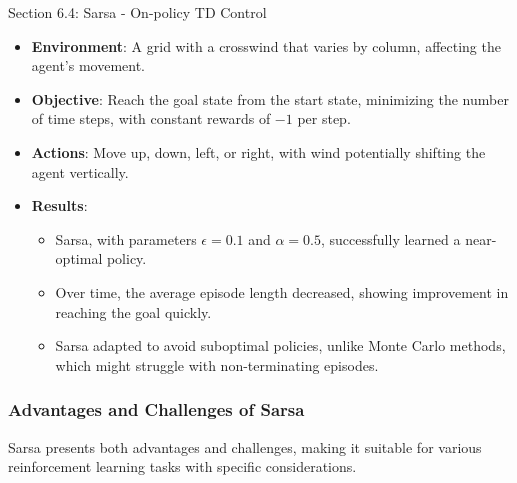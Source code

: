 \begin{notes}{Section 6.4: Sarsa - On-policy TD Control}
\begin{highlight}
        \begin{itemize}
            \item \textbf{Environment}: A grid with a crosswind that varies by column, affecting the agent's movement.
            \item \textbf{Objective}: Reach the goal state from the start state, minimizing the number of time steps, with constant rewards of $-1$ per step.
            \item \textbf{Actions}: Move up, down, left, or right, with wind potentially shifting the agent vertically.
            \item \textbf{Results}: 
                \begin{itemize}
                    \item Sarsa, with parameters $\epsilon = 0.1$ and $\alpha = 0.5$, successfully learned a near-optimal policy.
                    \item Over time, the average episode length decreased, showing improvement in reaching the goal quickly.
                    \item Sarsa adapted to avoid suboptimal policies, unlike Monte Carlo methods, which might struggle with non-terminating episodes.
                \end{itemize}
        \end{itemize}
    
    \end{highlight}
    
    \subsubsection*{Advantages and Challenges of Sarsa}
    
    Sarsa presents both advantages and challenges, making it suitable for various reinforcement learning tasks with specific considerations.
    
    \begin{highlight}
    

\end{highlight}
\end{notes}

